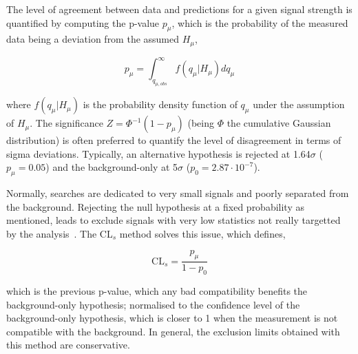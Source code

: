 The level of agreement between data and predictions for a given signal strength is quantified by computing the p-value $p_\mu$, which is the probability of the measured data being a deviation from the assumed $H_\mu$,

\begin{equation}
    p_\mu = \int_{q_{\mu,obs}}^\infty f(q_\mu|H_\mu)dq_\mu
\end{equation}

where $f(q_\mu|H_\mu)$ is the probability density function of $q_\mu$ under the assumption of $H_\mu$. The significance $Z=\Phi^{-1}(1-p_\mu)$ (being $\Phi$ the cumulative Gaussian distribution) is often preferred to quantify the level of disagreement in terms of sigma deviations. Typically, an alternative hypothesis is rejected at 1.64$\sigma$ ($p_\mu=0.05$) and the background-only at 5$\sigma$ ($p_0=2.87\cdot10^{-7}$).

Normally, searches are dedicated to very small signals and poorly separated from the background. Rejecting the null hypothesis at a fixed probability as mentioned, leads to exclude signals with very low statistics not really targetted by the analysis~\cite{JUNK1999435}. The CL$_{s}$ method solves this issue, which defines,

\begin{equation}
    \text{CL}_{s}=\frac{p_\mu}{1-p_0}
\end{equation}

which is the previous p-value, which any bad compatibility benefits the background-only hypothesis; normalised to the confidence level of the background-only hypothesis, which is closer to 1 when the measurement is not compatible with the background. In general, the exclusion limits obtained with this method are conservative.

